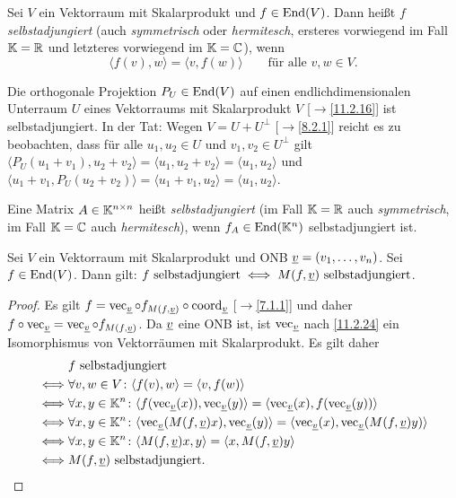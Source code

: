 \documentclass[../../main.tex]{subfiles}
\begin{document}
\begin{df}\label{11.3.1}
Sei $V$ ein Vektorraum mit Skalarprodukt und $f\in\operatorname{End}(V)$. Dann heißt $f$ \emph{selbstadjungiert} {\rm(}auch \emph{symmetrisch} oder \emph{hermitesch}, ersteres vorwiegend im Fall $\mathbb K=\mathbb R$ und letzteres vorwiegend im $\mathbb K=\mathbb C${\rm)}, wenn
$$\langle f(v),w\rangle=\langle v,f(w)\rangle\qquad\text{für alle $v,w\in V$}.$$
\end{df}

\begin{bsp}\label{11.3.2} Die orthogonale Projektion $P_U\in\operatorname{End}(V)$ auf einen endlichdimensionalen Unterraum $U$ eines Vektorraums mit Skalarprodukt $V$ [$\to$\ref{11.2.16}] ist selbstadjungiert. In der Tat: Wegen $V=U+U^\perp$ [$\to$\ref{8.2.1}] reicht es zu beobachten, dass für alle $u_1,u_2\in U$ und $v_1,v_2\in U^\perp$ gilt
$\langle P_U(u_1+v_1),u_2+v_2\rangle=\langle u_1,u_2+v_2\rangle=\langle u_1,u_2\rangle$ und
$\langle u_1+v_1,P_U(u_2+v_2)\rangle=\langle u_1+v_1,u_2\rangle=\langle u_1,u_2\rangle$.
\end{bsp}

\begin{df}\label{11.3.3}
Eine Matrix $A\in\mathbb K^{n\times n}$ heißt \emph{selbstadjungiert} {\rm(}im Fall $\mathbb K=\mathbb R$ auch \emph{symmetrisch}, im Fall $\mathbb K=\mathbb C$ auch \emph{hermitesch}{\rm)}, wenn $f_A\in\operatorname{End}(\mathbb K^n)$ selbstadjungiert ist.
\end{df}

\begin{sat}\label{11.3.4}
Sei $V$ ein Vektorraum mit Skalarprodukt und ONB ${\underline v}=(v_1,\dots,v_n)$.
Sei $f\in\operatorname{End}(V)$. Dann gilt: $\text{$f$ selbstadjungiert} \iff\text{$M(f,{\underline v})$ selbstadjungiert}$.
\end{sat}

\begin{proof} Es gilt $f=\operatorname{vec}_{\underline v}\circ f_{M(f,{\underline v})}\circ\operatorname{coord}_{\underline v}$ [$\to$\ref{7.1.1}] und daher
$f\circ\operatorname{vec}_{\underline v}=\operatorname{vec}_{\underline v}\circ f_{M(f,{\underline v})}$. Da ${\underline v}$ eine ONB ist, ist $\operatorname{vec}_{\underline v}$ nach \ref{11.2.24} ein Isomorphismus
von Vektorräumen mit Skalarprodukt. Es gilt daher
\begin{align*}
&\text{$f$ selbstadjungiert}\\
\iff&\forall v,w\in V\colon\langle f(v),w\rangle=\langle v,f(w)\rangle\\
\iff&\forall x,y\in\mathbb K^n\colon\langle f(\operatorname{vec}_{\underline v}(x)),\operatorname{vec}_{\underline v}(y)\rangle=\langle\operatorname{vec}_{\underline v}(x),f(\operatorname{vec}_{\underline v}(y))\rangle\\
\iff&\forall x,y\in\mathbb K^n\colon\langle \operatorname{vec}_{\underline v}(M(f,{\underline v})x),\operatorname{vec}_{\underline v}(y)\rangle=\langle\operatorname{vec}_{\underline v}(x),\operatorname{vec}_{\underline v}(M(f,{\underline v})y)\rangle\\
\iff&\forall x,y\in\mathbb K^n\colon\langle M(f,{\underline v})x,y\rangle=\langle x,M(f,{\underline v})y\rangle\\
\iff&\text{$M(f,{\underline v})$ selbstadjungiert}.
\end{align*}
\end{proof}
\end{document}
